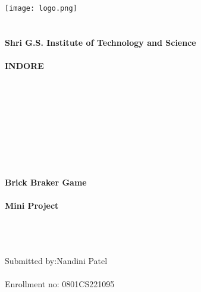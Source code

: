 \documentclass{article}
\author{Nandini Patel}
\date{ 30 October 2023}
\begin{document}
\begin{center}
\texttt{[image: logo.png]}
\textbf{}\\ \textbf{}\\ \textbf{}\\
\textbf{\huge Shri G.S. Institute of Technology and Science}\\ 
\textbf{}\\
\textbf{\huge INDORE}
\textbf{}\\ \textbf{}\\ \textbf{}\\ \textbf{}\\ \textbf{}\\ \textbf{}\\ \textbf{}\\ \textbf{}\\ \textbf{}\\ \textbf{}\\
\textbf{\huge {}\selectfont Brick Braker Game}\\
\textbf{}\\
\textbf{\huge {}\selectfont  Mini Project}
\end{center}
\textbf{}\\ \textbf{}\\ \textbf{}\\
\LARGE {}\selectfont Submitted by:Nandini Patel
\textbf{}\\ \textbf{}\\
\LARGE {}\selectfont Enrollment no: 0801CS221095
\pagebreak{}
\end{document}

